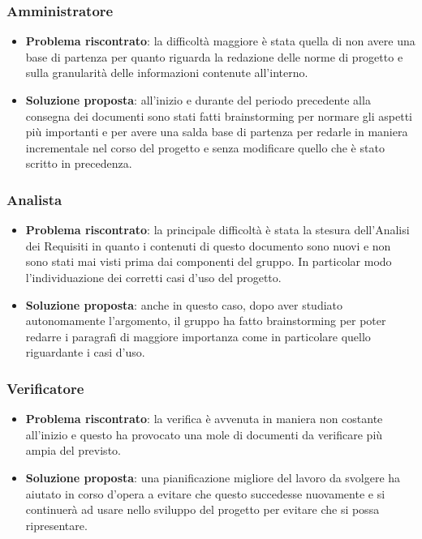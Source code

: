 		\subsubsection{Amministratore}
			\begin{itemize}
				\item \textbf{Problema riscontrato}: la difficoltà maggiore è stata quella di non avere una base di partenza per quanto riguarda la redazione delle norme di progetto e sulla granularità delle informazioni contenute all'interno.
				\item \textbf{Soluzione proposta}: all'inizio e durante del periodo precedente alla consegna dei documenti sono stati fatti brainstorming per normare gli aspetti più importanti e per avere una salda base di partenza per redarle in maniera incrementale nel corso del progetto e senza modificare quello che è stato scritto in precedenza.
			\end{itemize}

		\subsubsection{Analista}
			\begin{itemize}
				\item \textbf{Problema riscontrato}: la principale difficoltà è stata la stesura dell'Analisi dei Requisiti in quanto i contenuti di questo documento sono nuovi e non sono stati mai visti prima dai componenti del gruppo. In particolar modo l'individuazione dei corretti casi d'uso del progetto.
				\item \textbf{Soluzione proposta}: anche in questo caso, dopo aver studiato autonomamente l'argomento, il gruppo ha fatto brainstorming per poter redarre i paragrafi di maggiore importanza come in particolare quello riguardante i casi d'uso.
			\end{itemize}

		\subsubsection{Verificatore}
			\begin{itemize}
				\item \textbf{Problema riscontrato}: la verifica è avvenuta in maniera non costante all'inizio e questo ha provocato una mole di documenti da verificare più ampia del previsto.
				\item \textbf{Soluzione proposta}: una pianificazione migliore del lavoro da svolgere ha aiutato in corso d'opera a evitare che questo succedesse nuovamente e si continuerà ad usare nello sviluppo del progetto per evitare che si possa ripresentare.
			\end{itemize}

